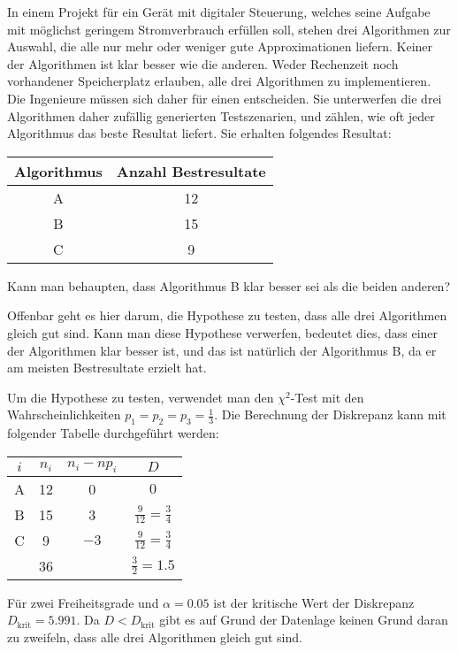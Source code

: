 In einem Projekt für ein Gerät mit digitaler Steuerung, welches
seine Aufgabe mit möglichst geringem Stromverbrauch erfüllen soll, stehen
drei Algorithmen zur Auswahl, die alle nur mehr oder weniger gute
Approximationen liefern. Keiner der Algorithmen ist klar besser wie
die anderen. Weder Rechenzeit noch vorhandener Speicherplatz
erlauben, alle drei Algorithmen zu implementieren. Die Ingenieure
müssen sich daher für einen entscheiden. Sie unterwerfen die drei
Algorithmen daher zufällig generierten Testszenarien, und zählen,
wie oft jeder Algorithmus das beste Resultat liefert. Sie erhalten
folgendes Resultat:
\begin{center}
\begin{tabular}{c|c}
Algorithmus&Anzahl Bestresultate\\
\hline
A&12\\
B&15\\
C&9\\
\end{tabular}
\end{center}
Kann man behaupten, dass Algorithmus B klar besser sei als die beiden
anderen?


\begin{loesung}
Offenbar geht es hier darum, die Hypothese zu testen, dass alle
drei Algorithmen gleich gut sind. Kann man diese Hypothese
verwerfen, bedeutet dies, dass einer der Algorithmen klar besser ist,
und das ist natürlich der Algorithmus B, da er am meisten Bestresultate
erzielt hat.

Um die Hypothese zu testen, verwendet man den $\chi^2$-Test mit
den Wahrscheinlichkeiten $p_1=p_2=p_3=\frac13$. Die Berechnung
der Diskrepanz kann mit folgender Tabelle durchgeführt werden:
\begin{center}
\begin{tabular}{|c|c|c|c|}
\hline
$i$&$n_i$&$n_i-np_i$&$D$\\
\hline
A&12&0&$0$\\
B&15&3&$\frac{9}{12}=\frac34$\\
C& 9&$-3$&$\frac{9}{12}=\frac34$\\
\hline
&36&&$\frac{3}{2}=1.5$\\
\hline
\end{tabular}
\end{center}
Für zwei Freiheitsgrade und $\alpha=0.05$ ist der kritische Wert der
Diskrepanz $D_{\text{krit}}=5.991$. Da $D<D_{\text{krit}}$ gibt es
auf Grund der Datenlage keinen Grund daran zu zweifeln, dass alle drei
Algorithmen gleich gut sind.
\end{loesung}

